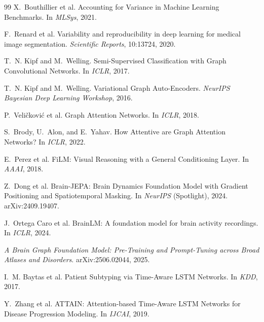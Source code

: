 \begin{thebibliography}{99}
X.~Bouthillier et al.
\newblock Accounting for Variance in Machine Learning Benchmarks.
\newblock In \emph{MLSys}, 2021.

F.~Renard et al.
\newblock Variability and reproducibility in deep learning for medical image segmentation.
\newblock \emph{Scientific Reports}, 10:13724, 2020.

T.~N. Kipf and M.~Welling.
\newblock Semi-Supervised Classification with Graph Convolutional Networks.
\newblock In \emph{ICLR}, 2017.

T.~N. Kipf and M.~Welling.
\newblock Variational Graph Auto-Encoders.
\newblock \emph{NeurIPS Bayesian Deep Learning Workshop}, 2016.

P.~Veli\v{c}kovi\'{c} et al.
\newblock Graph Attention Networks.
\newblock In \emph{ICLR}, 2018.

S.~Brody, U.~Alon, and E.~Yahav.
\newblock How Attentive are Graph Attention Networks?
\newblock In \emph{ICLR}, 2022.

E.~Perez et al.
\newblock FiLM: Visual Reasoning with a General Conditioning Layer.
\newblock In \emph{AAAI}, 2018.

Z.~Dong et al.
\newblock Brain-JEPA: Brain Dynamics Foundation Model with Gradient Positioning and
  Spatiotemporal Masking.
\newblock In \emph{NeurIPS} (Spotlight), 2024. arXiv:2409.19407.

J.~Ortega Caro et al.
\newblock BrainLM: A foundation model for brain activity recordings.
\newblock In \emph{ICLR}, 2024.

\emph{A Brain Graph Foundation Model: Pre-Training and Prompt-Tuning across Broad Atlases
  and Disorders}.
\newblock arXiv:2506.02044, 2025.

I.~M. Baytas et al.
\newblock Patient Subtyping via Time-Aware LSTM Networks.
\newblock In \emph{KDD}, 2017.

Y.~Zhang et al.
\newblock ATTAIN: Attention-based Time-Aware LSTM Networks for Disease Progression
  Modeling.
\newblock In \emph{IJCAI}, 2019.


\end{thebibliography}

